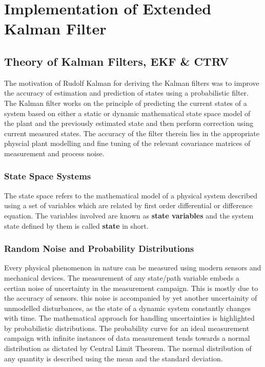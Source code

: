 \chapter{Implementation of Extended Kalman Filter}
\label{chap:ekf}
\section{Theory of Kalman Filters, EKF \& CTRV}

The motivation of Rudolf Kalman for deriving the Kalman filters was to improve the accuracy of estimation and prediction of states using a probabilistic filter. The Kalman filter works on the principle of predicting the current states of a system based on either a static or dynamic mathematical state space model of the plant and the previously estimated state and then perform correction using current measured states. The accuracy of the filter therein lies in the appropriate physcial plant modelling and fine tuning of the relevant covariance matrices of measurement and process noise.

\subsection{State Space Systems}
The state space refers to the mathematical model of a physical system described using a set of variables which are related by first order differential or difference equation. The variables involved are known as \textbf{state variables} and the system state defined by them is called \textbf{state} in short.

\subsection{Random Noise and Probability Distributions}

Every physical phenomenon in nature can be measured using modern sensors and mechanical devices. The measurement of any state/path variable embeds a certian noise of uncertainty in the measurement campaign. This is mostly due to the accuracy of sensors. this noise is accompanied by yet another uncertainity of unmodelled disturbances, as the state of a dynamic system constantly changes with time. The mathematical approach for handling uncertainties is highlighted by probabilistic distributions. The probability curve for an ideal measurement campaign with infinite instances of data measurement tends towards a normal distribution as dictated by Central Limit Theorem. The normal distribution of any quantity is described using the mean and the standard deviation.

